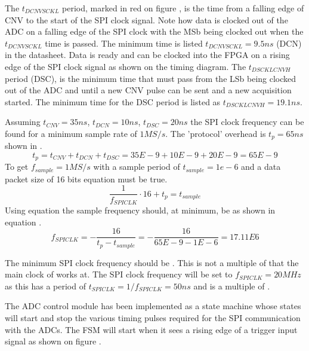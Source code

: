 The $t_{DCNVSCKL}$ period, marked in red on figure , is the time from a falling edge of CNV to the start of the SPI clock signal. Note how data is clocked out of the ADC on a falling edge of the SPI clock with the MSb being clocked out when the $t_{DCNVSCKL}$ time is passed. The minimum time is listed $t_{DCNVSCKL} = 9.5 ns$ (DCN) in the datasheet. Data is ready and can be clocked into the FPGA on a rising edge of the SPI clock signal as shown on the timing diagram. The $t_{DSCKLCNVH}$ period (DSC), is the minimum time that must pass from the LSb being clocked out of the ADC and until a new CNV pulse can be sent and a new acquisition started. The minimum time for the DSC period is listed as $t_{DSCKLCNVH} = 19.1 ns$.

Assuming $t_{CNV} = 35 ns$, $t_{DCN} = 10 ns$, $t_{DSC} = 20ns$ the SPI clock frequency can be found for a minimum sample rate of $1 MS/s$. The 'protocol' overhead is $t_p = 65 ns$ shown in .
\begin{equation}\label{eq:7_2_8_ProtocolOverhead}
        t_{p} = t_{CNV} + t_{DCN} + t_{DSC} = 35E-9 + 10 E-9 + 20 E-9 = 65 E-9
\end{equation}
To get $f_{sample} = 1 MS/s$ with a sample period of $t_{sample} = 1e-6$ and a data packet size of 16 bits equation  must be true.
\begin{equation}\label{eq:7_2_8_SampleFrq}
   \frac{1}{f_{SPICLK}} \cdot 16 + t_p = t_{sample}
\end{equation}
Using equation  the sample frequency should, at minimum, be  as shown in equation .
\begin{equation}\label{eq:7_2_8_SampleFrq2}
    f_{SPICLK} = -\frac{16}{t_{p} - t_{sample}} = -\frac{16}{65E-9 - 1E-6} = 17.11E6
 \end{equation}

The minimum SPI clock frequency should be . This is not a multiple of  that the main clock of  works at. The SPI clock frequency will be set to $f_{SPICLK} = 20 MHz$ as this has a period of $t_{SPICLK} = 1/f_{SPICLK} = 50 ns$ and is a multiple of .

 The ADC control module has been implemented as a state machine whose states will start and stop the various timing pulses required for the SPI communication with the ADCs. The FSM will start when it sees a rising edge of a trigger input signal as shown on figure .

